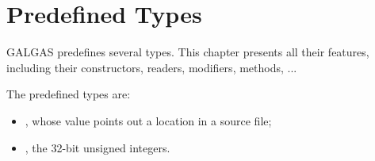 \chapter{Predefined Types} \label{predefinedTypes}

GALGAS predefines several types. This chapter presents all their features, including their constructors, readers, modifiers, methods, ...


\begin{description}
\item The predefined types are:
\begin{itemize}
\item {}, whose value points out a location in a source file;
\item {}, the 32-bit unsigned integers.
\end{itemize}
\end{description}




